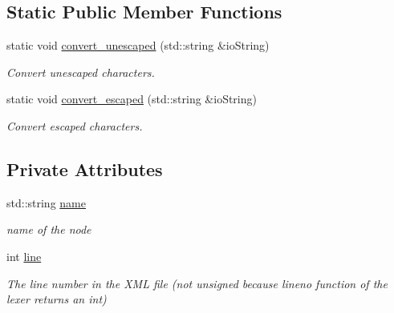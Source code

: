 \subsection*{Static Public Member Functions}
\begin{DoxyCompactItemize}
\item 
static void \hyperlink{classxml__node_a188abaf74feec1ee07866b84ce7d9550}{convert\+\_\+unescaped} (std\+::string \&io\+String)
\begin{DoxyCompactList}\small\item\em Convert unescaped characters. \end{DoxyCompactList}\item 
static void \hyperlink{classxml__node_aa867d7c40fe47d98344e38b37fd34c1d}{convert\+\_\+escaped} (std\+::string \&io\+String)
\begin{DoxyCompactList}\small\item\em Convert escaped characters. \end{DoxyCompactList}\end{DoxyCompactItemize}
\subsection*{Private Attributes}
\begin{DoxyCompactItemize}
\item 
std\+::string \hyperlink{classxml__node_ae2af9d4ef2a866cdb4497cd6e5c34b7a}{name}
\begin{DoxyCompactList}\small\item\em name of the node \end{DoxyCompactList}\item 
int \hyperlink{classxml__node_a3e6e3086fd295cda8b820510ce64ec0c}{line}
\begin{DoxyCompactList}\small\item\em The line number in the X\+ML file (not unsigned because lineno function of the lexer returns an int) \end{DoxyCompactList}\end{DoxyCompactItemize}
